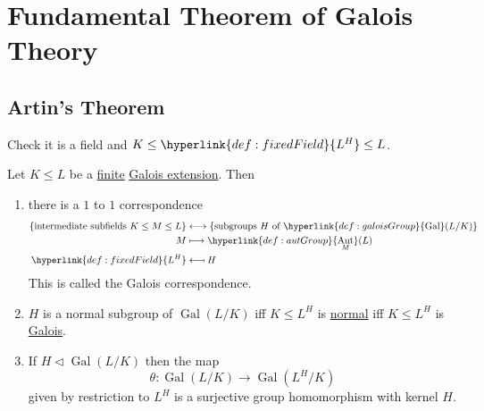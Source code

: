 \documentclass{article}
\DeclareMathOperator{\Aut}{Aut}
\DeclareMathOperator{\Gal}{Gal}
\begin{document}
\clearpage
\section{Fundamental Theorem of Galois Theory}
\subsection{Artin's Theorem}

\begin{ex}
    Check it is a field and $K \leq \hyperlink{def:fixedField}{L^H} \leq L$.
\end{ex}

\begin{nthm}\label{thm:3.2}
    Let $K \leq L$ be a \hyperlink{def:degreeOfFieldExt}{finite} \hyperlink{def:galoisExt}{Galois extension}.
    Then
    \begin{enumerate}[label=(\roman*)]
        \item there is a $1$ to $1$ correspondence
            \begin{align*}
                \{\text{intermediate subfields }K \leq M \leq L\} &\longleftrightarrow \{\text{subgroups $H$ of } \hyperlink{def:galoisGroup}{\Gal}(L/K)\} \\
                M &\longmapsto \hyperlink{def:autGroup}{\Aut_M}(L) \\
                \hyperlink{def:fixedField}{L^H} &\longmapsfrom H
            \end{align*}
            This is called the Galois correspondence.
        \item $H$ is a normal subgroup of $\Gal(L/K)$ iff $K \leq L^H$ is \hyperlink{def:normal}{normal} iff $K \leq L^H$ is \hyperlink{def:galoisExt}{Galois}.
        \item If $H \lhd \Gal(L/K)$ then the map
            \begin{equation*}
                \theta: \Gal(L/K) \longrightarrow \Gal(L^H/K)
            \end{equation*}
            given by restriction to $L^H$ is a surjective group homomorphism with kernel $H$.
    \end{enumerate}
\end{nthm}
\end{document}
